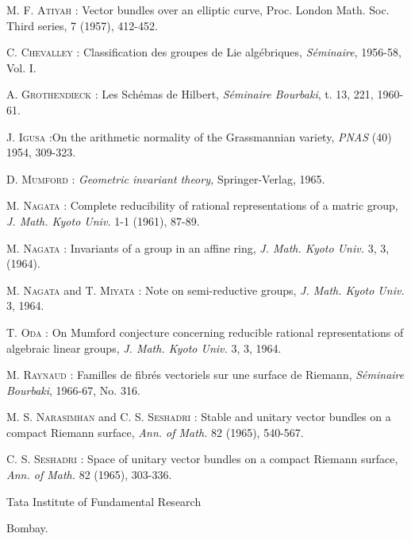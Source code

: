 \begin{thebibliography}{99}
 \textsc{M. F. Atiyah :} Vector bundles over an elliptic curve, {\rm Proc. London Math. Soc.} Third series, 7 (1957), 412-452.

 \textsc{C. Chevalley :} Classification des groupes de Lie alg\'ebriques, {\em S\'eminaire}, 1956-58, Vol. I.

 \textsc{A. Grothendieck :} Les Sch\'emas de Hilbert, {\em S\'eminaire Bourbaki}, t. 13, 221, 1960-61.

 \textsc{J. Igusa :}\pageoriginale On the arithmetic normality of the Grassmannian variety, {\em PNAS} (40) 1954, 309-323.

 \textsc{D. Mumford :} {\em Geometric invariant theory,} Springer-Verlag, 1965.

 \textsc{M. Nagata :} Complete reducibility of rational representations of a matric group, {\em J. Math. Kyoto Univ.} 1-1 (1961), 87-89.

 \textsc{M. Nagata :} Invariants of a group in an affine ring, {\em J. Math. Kyoto Univ.} 3, 3, (1964).

 \textsc{M. Nagata} and \textsc{T. Miyata :} Note on semi-reductive groups, {\em J. Math. Kyoto Univ.} 3, 1964.

 \textsc{T. Oda :} On Mumford conjecture concerning reducible rational representations of algebraic linear groups, {\em J. Math. Kyoto Univ.} 3, 3, 1964.

 \textsc{M. Raynaud :} Familles de fibr\'es vectoriels sur une surface de Riemann, {\em S\'eminaire Bourbaki}, 1966-67, No. 316.

 \textsc{M. S. Narasimhan} and \textsc{C. S. Seshadri :} Stable and unitary vector bundles on a compact Riemann surface, {\em Ann. of Math.} 82 (1965), 540-567.

 \textsc{C. S. Seshadri :} Space of unitary vector bundles on a compact Riemann surface, {\em Ann. of Math.} 82 (1965), 303-336.
\end{thebibliography}

\bigskip
\noindent
{\small Tata Institute of Fundamental Research}

\noindent
{\small Bombay.}

